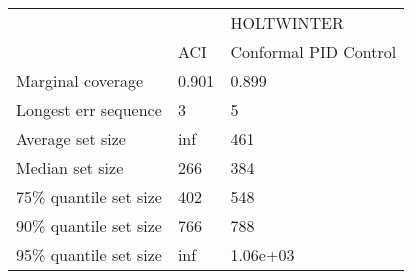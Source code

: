 \begin{tabular}{lll}
\toprule
& \multicolumn{2}{c}{HOLTWINTER} \\
& ACI & Conformal PID Control \\
\midrule
Marginal coverage & 0.901 & 0.899 \\
Longest err sequence & 3 & 5 \\
Average set size & inf & 461 \\
Median set size & 266 & 384 \\
75\% quantile set size & 402 & 548 \\
90\% quantile set size & 766 & 788 \\
95\% quantile set size & inf & 1.06e+03 \\
\bottomrule
\end{tabular}
